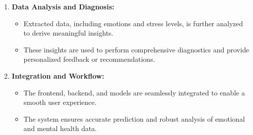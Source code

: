\begin{enumerate}
\begin{itemize}
    \end{itemize}
    \item \textbf{Data Analysis and Diagnosis:}
    \begin{itemize}
        \item Extracted data, including emotions and stress levels, is further analyzed to derive meaningful insights.
        \item These insights are used to perform comprehensive diagnostics and provide personalized feedback or recommendations.
    \end{itemize}
    \item \textbf{Integration and Workflow:}
    \begin{itemize}
        \item The frontend, backend, and models are seamlessly integrated to enable a smooth user experience.
        \item The system ensures accurate prediction and robust analysis of emotional and mental health data.
    \end{itemize}
\end{enumerate}

